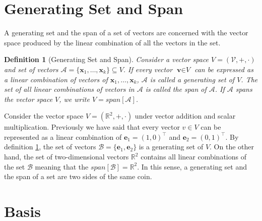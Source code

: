 \documentclass[a4paper,12pt]{book}
\newcommand{\set}[1]{\mathcal{#1}}
\newcommand{\vectr}[1]{\textbf{#1}}
\newcommand{\real}{\mathbb{R}}
\newcommand{\italic}[1]{\textit{#1}}
\newtheorem{definition}{Definition}[section]
\begin{document}
	\section{Generating Set and Span}
	
	A generating set and the span \cite[page 44]{mml_book} of a set of vectors are concerned with the vector space produced by the linear combination of all the vectors in the set.
	
	\begin{definition}[Generating Set and Span]
		\normalfont Consider a vector space $\italic{V} = (\set{V}, +, \cdot)$ and set of vectors $\set{A} = \{\vectr{x}_1,\ldots,\vectr{x}_k\} \subseteq \italic{V}$. If every vector $\vectr{v} \in \italic{V}$ can be expressed as a linear combination of vectors of $\vectr{x}_1,\ldots,\vectr{x}_k$, $\set{A}$ is called a generating set of $\italic{V}$. The set of all linear combinations of vectors in $\set{A}$ is called the span of $\set{A}$. If $\set{A}$ spans the vector space $\italic{V}$, we write $\italic{V} = span[\set{A}]$. 
		\label{def:generating_set_span}
	\end{definition}
	
	Consider the vector space $ V = (\real^{2}, +, \cdot) $ under vector addition and scalar multiplication. Previously we have said that every vector $ v \in V $ can be represented as a linear combination of $\vectr{e}_1 = (1, 0)^{\top}$ and $\vectr{e}_2 = (0, 1)^{\top}$. By definition \ref{def:generating_set_span}, the set of vectors $ \set{B} = \{ \vectr{e}_1, \vectr{e}_2 \} $ is a generating set of $ V $. 
	On the other hand, the set of two-dimensional vectors $ \real^{2} $ contains all linear combinations of the set $ \set{B} $ meaning that the $ span[\set{B}] = \real^{2} $. In this sense, a generating set and the span of a set are two sides of the same coin.
	\section{Basis}
	
\end{document}
